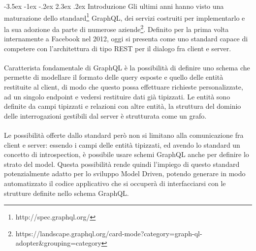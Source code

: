 \documentclass[a4paper, 12pt]{report}
\begin{document}

\graphicspath{ {./} }
\setlength{\parindent}{0em}
\setcounter{secnumdepth}{0}
\makeatletter
\renewcommand\section{\@startsection{section}{1}{\z@}%
                                   {-3.5ex \@plus -1ex \@minus -.2ex}%
                                   {2.3ex \@plus.2ex}%
                                   {\normalfont\large\bfseries\center}}
  \section{Introduzione}
  Gli ultimi anni hanno visto una maturazione dello standard\footnote{http://spec.graphql.org/} GraphQL, dei servizi costruiti per implementarlo e la sua adozione da parte di numerose aziende\footnote{https://landscape.graphql.org/card-mode?category=graph-ql-adopter\&grouping=category}.
  Definito per la prima volta internamente a Facebook nel 2012, oggi si presenta come uno standard capace di competere con l'architettura di tipo REST per il dialogo fra client e server.
  \paragraph*{}
  Caratterista fondamentale di GraphQL è la possibilità di definire uno schema che permette di modellare il formato delle query esposte e quello delle entità restituite al client, di modo che questo possa effettuare richieste personalizzate, ad un singolo endpoint e vedersi restituire dati già tipizzati.
    Le entità sono definite da campi tipizzati e relazioni con altre entità, la struttura del dominio delle interrogazioni gestibili dal server è strutturata come un grafo.
    \paragraph*{}Le possibilità offerte dallo standard però non si limitano alla comunicazione fra client e server: essendo i campi delle entità tipizzati, ed avendo lo standard un concetto di introspection, è possibile usare 
    schemi GraphQL anche per definire lo strato del model.
    Questa possibilità rende quindi l'impiego di questo standard potenzialmente adatto per lo sviluppo Model Driven, potendo generare in modo automatizzato il codice applicativo che si occuperà di interfacciarsi con le strutture definite nello schema GraphQL.
\end{document}
